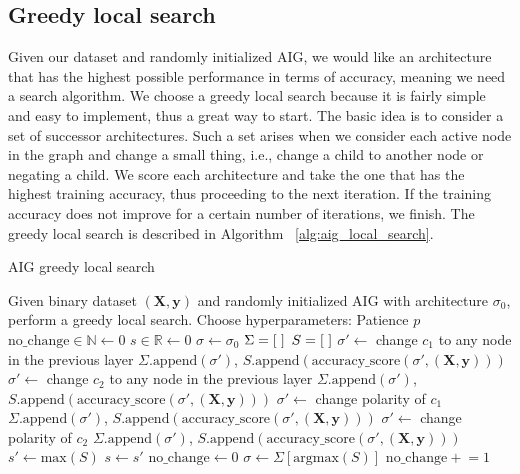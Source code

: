 \subsection{Greedy local search}
Given our dataset and randomly initialized AIG, we would like an architecture that has the highest possible performance in terms of accuracy, meaning we need a search algorithm. We choose a greedy local search \cite{bib:koller2009probabilistic} because it is fairly simple and easy to implement, thus a great way to start. The basic idea is to consider a set of successor architectures. Such a set arises when we consider each active node in the graph and change a small thing, i.e., change a child to another node or negating a child. We score each architecture and take the one that has the highest training accuracy, thus proceeding to the next iteration. If the training accuracy does not improve for a certain number of iterations, we finish. The greedy local search is described in Algorithm~
\ref{alg:aig_local_search}.

\begin{algorithm}
  \caption{AIG greedy local search}
  \label{alg:aig_local_search}
  \begin{algorithmic}
    \State Given binary dataset $(\boldsymbol{X}, \bm{y})$ and randomly initialized AIG with architecture $\sigma_0$, perform a greedy local search.
    \vspace{1em}
    \State Choose hyperparameters:
      \Statein Patience $p$
    \State $\text{no\_change} \in \mathds{N} \gets 0$
    \State $s \in \mathds{R} \gets 0$
    \State $\sigma \gets \sigma_0$
      \State $\Sigma = [\hspace{0.3em}]$
      \State $S = [\hspace{0.3em}]$
          \State $\sigma' \gets$ change $c_1$ to any node in the previous layer
          \State $\Sigma.\text{append}(\sigma')$, $S.\text{append}(\text{accuracy\_score}(\sigma', (\bm{X}, \bm{y})))$
          \State $\sigma' \gets$ change $c_2$ to any node in the previous layer
          \State $\Sigma.\text{append}(\sigma')$, $S.\text{append}(\text{accuracy\_score}(\sigma', (\bm{X}, \bm{y})))$
          \State $\sigma' \gets$ change polarity of $c_1$
          \State $\Sigma.\text{append}(\sigma')$, $S.\text{append}(\text{accuracy\_score}(\sigma', (\bm{X}, \bm{y})))$
          \State $\sigma' \gets$ change polarity of $c_2$
          \State $\Sigma.\text{append}(\sigma')$, $S.\text{append}(\text{accuracy\_score}(\sigma', (\bm{X}, \bm{y})))$
      \EndFor
      \State $s' \gets \text{max}(S)$
        \State $s \gets s'$
        \State $\text{no\_change} \gets 0$
        \State $\sigma \gets \Sigma[\text{argmax}(S)]$
      \Else
        \State $\text{no\_change} \mathrel{+}= 1$
      \EndIf
    \EndWhile
  \end{algorithmic}
\end{algorithm}
\FloatBarrier

